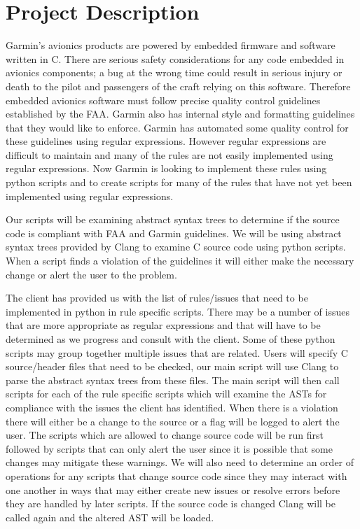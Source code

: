 \documentclass[11pt]{scrreprt}
\begin{document}
\section{Project Description}
Garmin’s avionics products are powered by embedded firmware and software written in C. There are serious safety considerations for any code embedded in avionics components; a bug at the wrong time could result in serious injury or death to the pilot and passengers of the craft relying on this software. Therefore embedded avionics software must follow precise quality control guidelines established by the FAA. Garmin also has internal style and formatting guidelines that they would like to enforce. Garmin has automated some quality control for these guidelines using regular expressions. However regular expressions are difficult to maintain and many of the rules are not easily implemented using regular expressions. Now Garmin is looking to implement these rules using python scripts and to create scripts for many of the rules that have not yet been implemented using regular expressions.

Our scripts will be examining abstract syntax trees to determine if the source code is compliant with FAA and Garmin guidelines. We will be using abstract syntax trees provided by Clang to examine C source code using python scripts. When a script finds a violation of the guidelines it will either make the necessary change or alert the user to the problem.

The client has provided us with the list of rules/issues that need to be implemented in python in rule specific scripts. There may be a number of issues that are more appropriate as regular expressions and that will have to be determined as we progress and consult with the client. Some of these python scripts may group together multiple issues that are related. Users will specify C source/header files that need to be checked, our main script will use Clang to parse the abstract syntax trees from these files. The main script will then call scripts for each of the rule specific scripts which will examine the ASTs for compliance with the issues the client has identified. When there is a violation there will either be a change to the source or a flag will be logged to alert the user. The scripts which are allowed to change source code will be run first followed by scripts that can only alert the user since it is possible that some changes may mitigate these warnings. We will also need to determine an order of operations for any scripts that change source code since they may interact with one another in ways that may either create new issues or resolve errors before they are handled by later scripts. If the source code is changed Clang will be called again and the altered AST will be loaded.
\end{document}
